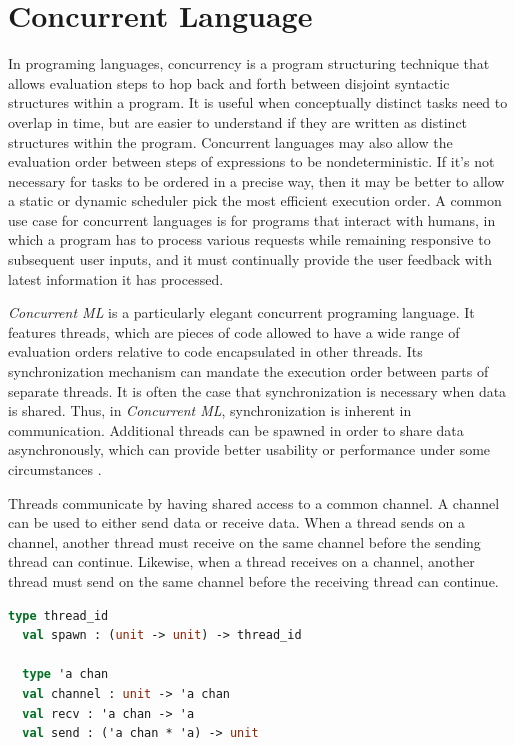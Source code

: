 \documentclass[10pt]{article}
\begin{document}
\section{Concurrent Language}
In programing languages, concurrency is a program structuring technique that allows evaluation
steps to hop back and forth between disjoint syntactic structures within a program.
It is useful
when conceptually distinct tasks need to overlap in time, but are easier to understand if they
are written as distinct structures within the program. Concurrent languages may also allow the
evaluation order between steps of expressions to be nondeterministic. If it's not necessary for
tasks to be ordered in a precise way, then it may be better to allow a static or dynamic
scheduler pick the most efficient execution order. A common use case for concurrent languages
is for programs that interact with humans, in which a program has to process various requests
while remaining responsive to subsequent user inputs, and it must continually provide the user
feedback with latest information it has processed.

\textit{Concurrent ML} is a particularly elegant concurrent programing language.
It features threads, which are pieces of code allowed to have a wide range of
evaluation orders relative to code encapsulated in other threads. Its synchronization
mechanism can mandate the execution order between parts of separate threads. It is often the
case that synchronization is necessary when data is shared. Thus, in \textit{Concurrent ML},
synchronization is inherent in communication. Additional threads can be spawned
in order to share data asynchronously, which can provide better usability or performance under
some circumstances \cite{}.

Threads communicate by having shared access to a common channel. A channel can be used to
either send data or receive data.  When a thread sends on a channel, another thread must
receive on the same channel before the sending thread can continue.  Likewise, when a thread
receives on a channel, another thread must send on the same channel before the receiving thread
can continue.

\begin{lstlisting}[language=ML]
  type thread_id
  val spawn : (unit -> unit) -> thread_id

  type 'a chan
  val channel : unit -> 'a chan
  val recv : 'a chan -> 'a
  val send : ('a chan * 'a) -> unit
  \end{lstlisting}
\end{document}
